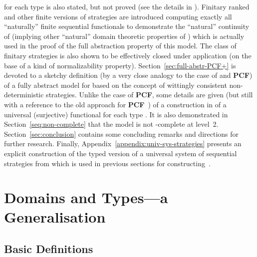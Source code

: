 \documentclass[fleqn]{LMCS}
\theoremstyle{plain}\newtheorem{satz}[thm]{Satz}
\theoremstyle{plain}\newtheorem{hyp}[thm]{Hypothesis}
\theoremstyle{plain}\newtheorem{hyps}[thm]{Hypotheses}
\theoremstyle{definition}\newtheorem{note}[thm]{Note}
\newcommand{\PCF}{\mbox{\bf PCF}}
\newcommand{\?}{\mbox{?}}
\begin{document}
for each type  is also stated, but not proved (see the details in \cite{Saz76AL}).
Finitary ranked and other finite versions of 
strategies are introduced computing exactly all 
``naturally'' finite sequential functionals to demonstrate the ``natural'' continuity 
of  (implying other ``natural'' domain theoretic 
properties of ) 
which is actually used in the proof of the full abstraction property of this model. 
The class of finitary strategies is also shown to be effectively closed under 
application (on the base of a kind of normalizability property).
Section~\ref{sec:full-abstr-PCF+} is devoted 
to a sketchy definition (by a very close analogy to the case of  and \PCF) 
of a fully abstract model  for  based on the concept of 
wittingly consistent non-deterministic strategies. 
Unlike the case of \PCF, some details are given 
(but still with a reference to the old approach for \PCF\ \cite{Saz76AL}) 
of a construction in  of a universal (surjective) 
functional  
for each type . 
It is also demonstrated in 
Section~\ref{seq:non-complete} 
that the model  is not -complete at level~2. 
Section~\ref{sec:conclusion} contains some concluding remarks 
and directions for further research. 
Finally, Appendix~\ref{appendix:univ-sys-strategies} 
presents an explicit construction of the typed version of a universal system 
of sequential strategies  from \cite{Saz76t} which is used 
in previous sections for constructing~. 
































\section{Domains and Types---a Generalisation}
\label{sec:prelim}

\subsection{Basic Definitions}\label{sec:basic-def}
\end{document}
